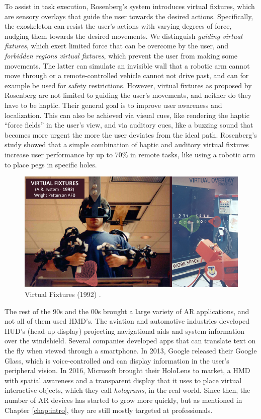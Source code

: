 To assist in task execution, Rosenberg's system introduces virtual fixtures, which are sensory overlays that guide the user towards the desired actions. Specifically, the exoskeleton can resist the user's actions with varying degrees of force, nudging them towards the desired movements. We distinguish \textit{guiding virtual fixtures}, which exert limited force that can be overcome by the user, and \textit{forbidden regions virtual fixtures}, which prevent the user from making some movements. The latter can simulate an invisible wall that a robotic arm cannot move through or a remote-controlled vehicle cannot not drive past, and can for example be used for safety restrictions. However, virtual fixtures as proposed by Rosenberg are not limited to guiding the user's movements, and neither do they have to be haptic. Their general goal is to improve user awareness and localization. This can also be achieved via visual cues, like rendering the haptic ``force fields'' in the user's view, and via auditory cues, like a buzzing sound that becomes more urgent the more the user deviates from the ideal path. Rosenberg's study showed that a simple combination of haptic and auditory virtual fixtures increase user performance by up to 70\% in remote tasks, like using a robotic arm to place pegs in specific holes.

\begin{figure}
    \centering
    \includegraphics[width=0.8\linewidth]{resources/introduction/virtual_fixtures.jpg}
    \caption{Virtual Fixtures (1992) \cite{sutherland1968head}.}
    \label{fig:virtual_fixtures}
\end{figure}

The rest of the 90s and the 00s brought a large variety of AR applications, and not all of them used HMD's. The aviation and automotive industries developed HUD's (head-up display) projecting navigational aids and system information over the windshield. Several companies developed apps that can translate text on the fly when viewed through a smartphone. In 2013, Google released their Google Glass, which is voice-controlled and can display information in the user's peripheral vision. In 2016, Microsoft brought their HoloLens to market, a HMD with spatial awareness and a transparent display that it uses to place virtual interactive objects, which they call \textit{holograms}, in the real world. Since then, the number of AR devices has started to grow more quickly, but as mentioned in Chapter \ref{chap:intro}, they are still mostly targeted at professionals.


